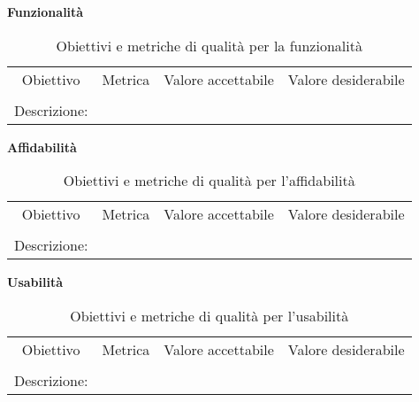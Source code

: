 \documentclass[../piano-di-qualifica.tex]{subfiles}
\begin{document}
\begin{center}
    \centering
    \textbf{Funzionalità}
\end{center}
    \begin{table}[H]
        \centering
        \begin{tabular}{cccc}
        Obiettivo    & Metrica & Valore accettabile & Valore desiderabile \\
                     &         &                    &                    \\
        Descrizione: & \multicolumn{3}{c}{}        
        \end{tabular}
        \caption{Obiettivi e metriche di qualità per la funzionalità}
    \end{table}

    \begin{center}
        \centering
        \textbf{Affidabilità}
    \end{center}
        \begin{table}[H]
            \centering
            \begin{tabular}{cccc}
            Obiettivo    & Metrica & Valore accettabile & Valore desiderabile \\
                         &         &                    &                    \\
            Descrizione: & \multicolumn{3}{c}{}        
            \end{tabular}
            \caption{Obiettivi e metriche di qualità per l'affidabilità}
        \end{table}

    \begin{center}
        \centering
        \textbf{Usabilità}
    \end{center}
        \begin{table}[H]
            \centering
            \begin{tabular}{cccc}
            Obiettivo    & Metrica & Valore accettabile & Valore desiderabile \\
                         &         &                    &                    \\
            Descrizione: & \multicolumn{3}{c}{}        
            \end{tabular}
            \caption{Obiettivi e metriche di qualità per l'usabilità}
        \end{table}
\end{document}
